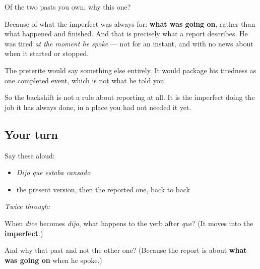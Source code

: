 \begin{culture}
Of the two pasts you own, why this one?

Because of what the imperfect was always for: \textbf{what was going on}, rather than what happened and finished. And that is precisely what a report describes. He was tired \emph{at the moment he spoke} — not for an instant, and with no news about when it started or stopped.

The preterite would say something else entirely. It would package his tiredness as one completed event, which is not what he told you.

So the backshift is not a rule about reporting at all. It is the imperfect doing the job it has always done, in a place you had not needed it yet.
\end{culture}

\subsection*{Your turn}
Say these aloud:

\begin{itemize}
\raggedright
  \item \emph{Dijo que estaba cansado}
  \item the present version, then the reported one, back to back
\end{itemize}

\emph{Twice through:}

\begin{tcolorbox}[breakable,colback=teal!4,colframe=teal!35!black,title={Before you move on}]
When \emph{dice} becomes \emph{dijo}, what happens to the verb after \emph{que}? (It moves into the \textbf{imperfect}.)

And why that past and not the other one? (Because the report is about \textbf{what was going on} when he spoke.)
\end{tcolorbox}
